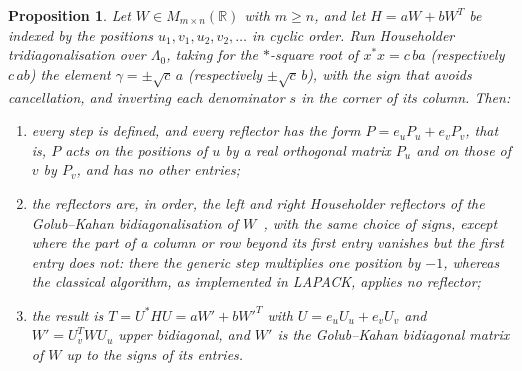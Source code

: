 \documentclass[12pt, a4paper]{report}
\theoremstyle{plain}
\newtheorem{proposition}[theorem]{Proposition}
\theoremstyle{definition}
\theoremstyle{remark}
\theoremstyle{plain}
\newcommand{\RR}{\mathbb{R}}
\begin{document}
\begin{proposition}\label{prop:golub-kahan}
Let $W\in M_{m\times n}(\RR)$ with $m\geq n$, and let $H=aW+bW^T$ be indexed by the positions $u_1,v_1,u_2,v_2,\dots$ in cyclic order. Run Householder tridiagonalisation over $\Lambda_0$, taking for the $*$-square root of $x^*x=c\,ba$ (respectively $c\,ab$) the element $\gamma=\pm\sqrt c\,a$ (respectively $\pm\sqrt c\,b$), with the sign that avoids cancellation, and inverting each denominator $s$ in the corner of its column. Then:
\begin{enumerate}
  \item every step is defined, and every reflector has the form $P=e_uP_u+e_vP_v$, that is, $P$ acts on the positions of $u$ by a real orthogonal matrix $P_u$ and on those of $v$ by $P_v$, and has no other entries;
  \item the reflectors are, in order, the left and right Householder reflectors of the Golub--Kahan bidiagonalisation of $W$~\cite{GolubKahan1965}, with the same choice of signs, except where the part of a column or row beyond its first entry vanishes but the first entry does not: there the generic step multiplies one position by $-1$, whereas the classical algorithm, as implemented in LAPACK, applies no reflector;
  \item the result is $T=U^*HU=aW'+bW'^T$ with $U=e_uU_u+e_vU_v$ and $W'=U_v^TWU_u$ upper bidiagonal, and $W'$ is the Golub--Kahan bidiagonal matrix of $W$ up to the signs of its entries.
\end{enumerate}
\end{proposition}
\end{document}
